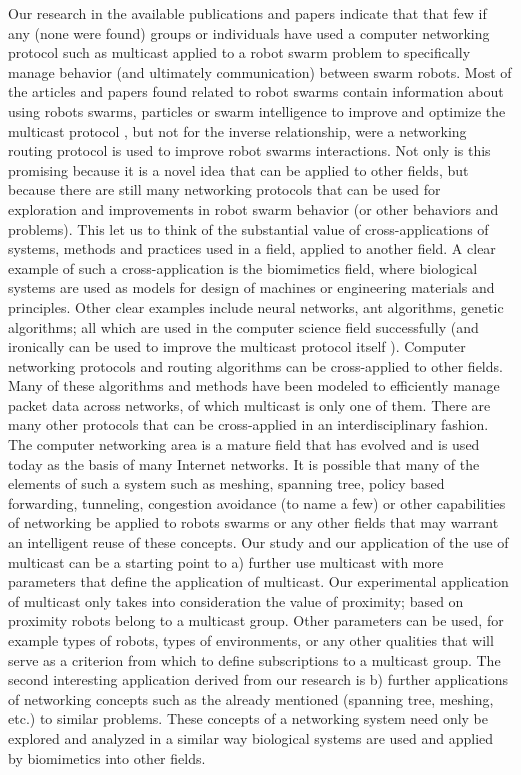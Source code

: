 \documentclass[journal]{IEEEtran}
\begin{document}
Our research in the available publications and papers indicate that that few if any (none were found) groups or individuals have used a computer networking protocol such as multicast applied to a robot swarm problem to specifically manage behavior (and ultimately communication) between swarm robots.
Most of the articles and papers found related to robot swarms contain information about using robots swarms, particles or swarm intelligence to improve and optimize the multicast protocol \cite{IG1}\cite{IG2}\cite{IG3}, but not for the inverse relationship, were a networking routing protocol is used to improve robot swarms interactions. 
Not only is this promising because it is a novel idea that can be applied to other fields, but because there are still many networking protocols that can be used for exploration and improvements in robot swarm behavior (or other behaviors and problems). 
This let us to think of the substantial value of cross-applications of systems, methods and practices used in a field, applied to another field. A clear example of such a cross-application is the biomimetics field, where biological systems are used as models for design of machines or engineering materials and principles. Other clear examples include neural networks, ant algorithms, genetic algorithms; all which are used in the computer science field successfully (and ironically can be used to improve the multicast protocol itself \cite{IG1}\cite{IG2}\cite{IG3}). 
Computer networking protocols and routing algorithms can be cross-applied to other fields. Many of these algorithms and methods have been modeled to efficiently manage packet data across networks, of which multicast is only one of them.  There are many other protocols that can be cross-applied in an interdisciplinary fashion. The computer networking area is a mature field that has evolved and is used today as the basis of many Internet networks. It is possible that many of the elements of such a system such as meshing, spanning tree, policy based forwarding, tunneling, congestion avoidance (to name a few) or other capabilities of networking be applied to robots swarms or any other fields that may warrant an intelligent reuse of these concepts.  Our study and our application of the use of multicast can be a starting point to a) further use multicast with more parameters that define the application of multicast. Our experimental application of multicast only takes into consideration the value of proximity; based on proximity robots belong to a multicast group. Other parameters can be used, for example types of robots, types of environments, or any other qualities that will serve as a criterion from which to define subscriptions to a multicast group. The second interesting application derived from our research is b) further applications of networking concepts such as the already mentioned (spanning tree, meshing, etc.) to similar problems. These concepts of a networking system need only be explored and analyzed in a similar way biological systems are used and applied by biomimetics into other fields. 
\end{document}
